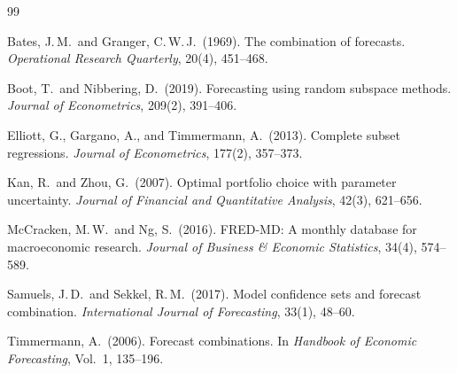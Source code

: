 \documentclass[12pt,a4paper]{article}
\theoremstyle{definition}
\begin{document}
\begin{thebibliography}{99}

Bates, J.\,M.\ and Granger, C.\,W.\,J.\ (1969).
The combination of forecasts.
\textit{Operational Research Quarterly}, 20(4), 451--468.

Boot, T.\ and Nibbering, D.\ (2019).
Forecasting using random subspace methods.
\textit{Journal of Econometrics}, 209(2), 391--406.

Elliott, G., Gargano, A., and Timmermann, A.\ (2013).
Complete subset regressions.
\textit{Journal of Econometrics}, 177(2), 357--373.

Kan, R.\ and Zhou, G.\ (2007).
Optimal portfolio choice with parameter uncertainty.
\textit{Journal of Financial and Quantitative Analysis}, 42(3), 621--656.

McCracken, M.\,W.\ and Ng, S.\ (2016).
FRED-MD: A monthly database for macroeconomic research.
\textit{Journal of Business \& Economic Statistics}, 34(4), 574--589.

Samuels, J.\,D.\ and Sekkel, R.\,M.\ (2017).
Model confidence sets and forecast combination.
\textit{International Journal of Forecasting}, 33(1), 48--60.

Timmermann, A.\ (2006).
Forecast combinations.
In \textit{Handbook of Economic Forecasting}, Vol.\ 1, 135--196.

\end{thebibliography}
\end{document}
